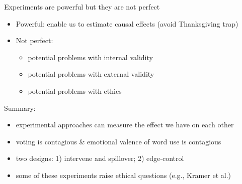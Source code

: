 \documentclass[aspectratio=169]{beamer}
\begin{document}
%
%
%
%
\begin{frame}

Experiments are powerful but they are not perfect \pause

\begin{itemize}
\item Powerful: enable us to estimate causal effects (avoid Thanksgiving trap) \pause
\item Not perfect: 
\begin{itemize}
\item potential problems with internal validity
\item potential problems with external validity
\item potential problems with ethics
\end{itemize}
\end{itemize}

\end{frame}
\begin{frame}

Summary:\\
\begin{itemize}
\item experimental approaches can measure the effect we have on each other
\pause 
\item voting is contagious \& emotional valence of word use is contagious
\pause
\item two designs: 1) intervene and spillover; 2) edge-control
\pause
\item some of these experiments raise ethical questions (e.g., Kramer et al.)
\end{itemize}

\end{frame}
\end{document}
